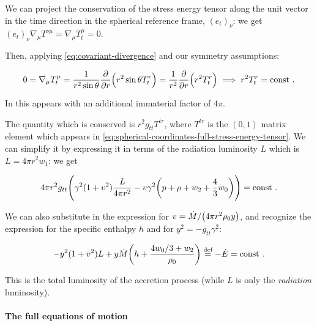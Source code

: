 \documentclass[main.tex]{subfiles}
\begin{document}
We can project the conservation of the stress energy tensor along the unit vector in the time direction in the spherical reference frame, \((e_t)_\nu\): we get  \((e_t)_\nu \nabla_\mu T^{\nu\mu} = \nabla_\mu T_t^\mu = 0\).

Then, applying \eqref{eq:covariant-divergence} and our symmetry assumptions:

\begin{equation}
  0=\nabla_\mu T_t^{\mu}
  = \frac{1}{r^2 \sin \theta} \pdv{}{r} \qty(r^2 \sin\theta T_t^{r})
  = \frac{1}{r^2} \pdv{}{r} \qty(r^2 T_t^{r})
  \implies
  r^2 T_t^{r} = \const \,.
\end{equation}

In \cite[before eq. 18c]{ThorneFLammmangZytkow:1981feb} this appears with an additional immaterial factor of \(4 \pi\).

The quantity which is conserved is \(r^2 g_{tt}T^{tr}\), where \(T^{tr}\) is the $(0,1)$ matrix element which appears in \eqref{eq:spherical-coordinates-full-stress-energy-tensor}. We can simplify it by expressing it in terms of the radiation luminosity \(L\) which is \(L = 4 \pi r^2 w_1\): we get

\begin{equation}
  4 \pi r^2 g_{tt} \qty(\gamma^2 (1+ v^2) \frac{L}{4 \pi r^2} - v \gamma^2 \qty(p + \rho + w_2 + \frac{4}{3} w_0)) = \const\,.
\end{equation}

We can also substitute in the expression for \(v = \dot{M} / \qty(4 \pi r^2 \rho_0 y) \), and recognize the expression for the specific enthalpy \(h\) and for \(y^2 =- g_{tt} \gamma^2\):

\begin{equation}
    -y^2 (1+v^2) L + y \dot{M} \qty(h + \frac{4w_0/3 + w_2}{\rho_0}) \defeq -\dot{E}
    = \const\,.
\end{equation}

This is the total luminosity of the accretion process (while \(L\) is only the \emph{radiation} luminosity).

\paragraph{The full equations of motion}
\end{document}
